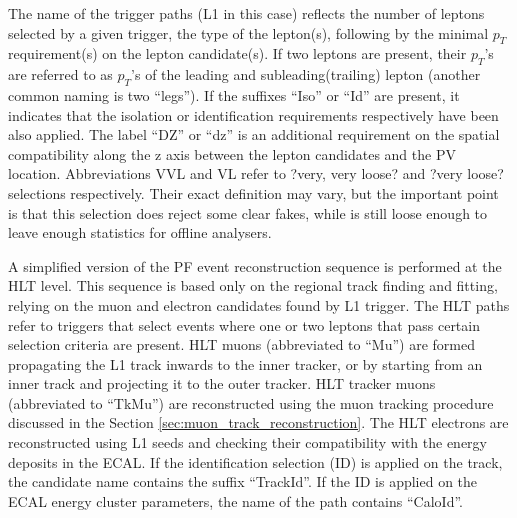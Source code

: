 The name of the trigger paths (L1 in this case) reflects the number of leptons selected by a given trigger, the type of the lepton(s), following by the minimal $p_T$ requirement(s) on the lepton candidate(s). If two leptons are present, their $p_T$'s are referred to as $p_T$'s of the leading and subleading(trailing) lepton (another common naming is two ``legs''). If the suffixes ``Iso'' or ``Id'' are present, it indicates that the isolation or identification requirements respectively have been also applied. The label ``DZ'' or ``dz'' is an additional requirement on the spatial compatibility along the z axis between the lepton candidates and the PV location. Abbreviations VVL and VL refer to ?very, very loose? and ?very loose? selections respectively. Their exact definition may vary, but the important point is that this selection does reject some clear fakes, while is still loose enough to leave enough statistics for offline analysers. 

A simplified version of the PF event reconstruction sequence is performed at the HLT level. This sequence is based only on the regional track finding and fitting, relying on the muon and electron candidates found by L1 trigger. The HLT paths refer to triggers that select events where one or two leptons that pass certain selection criteria are present. HLT muons (abbreviated to ``Mu'') are formed propagating the L1 track inwards to the inner tracker, or by starting from an inner track and projecting it to the outer tracker. HLT tracker muons (abbreviated to ``TkMu'') are reconstructed using the muon tracking procedure discussed in the Section \ref{sec:muon_track_reconstruction}. The HLT electrons are reconstructed using L1 seeds and checking their compatibility with the energy deposits in the ECAL. If the identification selection (ID) is applied on the track, the candidate name contains the suffix ``TrackId''. If the ID is applied on the ECAL energy cluster parameters, the name of the path contains ``CaloId''.



\iffalse

